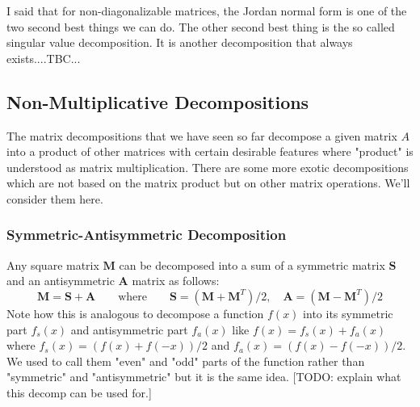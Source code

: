 I said that for non-diagonalizable matrices, the Jordan normal form is one of the two second best things we can do. The other second best thing is the so called singular value decomposition. It is another decomposition that always exists....TBC...










\subsection{Non-Multiplicative Decompositions}
The matrix decompositions that we have seen so far decompose a given matrix $A$ into a product of other matrices with certain desirable features where "product" is understood as matrix multiplication. There are some more exotic decompositions which are not based on the matrix product but on other matrix operations. We'll consider them here.

\subsubsection{Symmetric-Antisymmetric Decomposition}
Any square matrix $\mathbf{M}$ can be decomposed into a sum of a symmetric matrix $\mathbf{S}$ and an antisymmetric $\mathbf{A}$ matrix as follows:
\begin{equation}
\mathbf{M} = \mathbf{S + A} \qquad \text{where}  \qquad
\mathbf{S} = (\mathbf{M} + \mathbf{M}^T) / 2,  \quad
\mathbf{A} = (\mathbf{M} - \mathbf{M}^T) / 2
\end{equation}
Note how this is analogous to decompose a function $f(x)$ into its symmetric part $f_s(x)$ and antisymmetric part $f_a(x)$ like $f(x) = f_s(x) + f_a(x)$ where $f_s(x) = (f(x) + f(-x)) / 2$ and $f_a(x) = (f(x) - f(-x)) / 2$. We used to call them "even" and "odd" parts of the function rather than "symmetric" and "antisymmetric" but it is the same idea. [TODO: explain what this decomp can be used for.]

